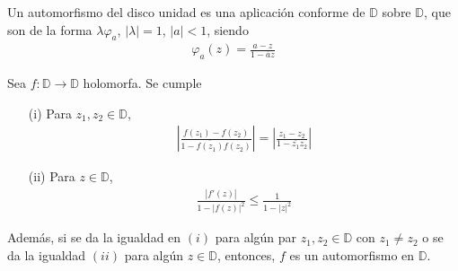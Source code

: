 \begin{defi}Un automorfismo del disco unidad es una aplicación conforme de $\mathbb{D}$ sobre $\mathbb{D}$, que son de la forma $\lambda\varphi_a$, $|\lambda| = 1$, $|a| < 1$, siendo
    \begin{align*}
        \varphi_a(z) = \frac{a-z}{1-\overline{a}z}
    \end{align*}
\end{defi}

\begin{teo}
    Sea $f: \mathbb{D} \longrightarrow \mathbb{D}$ holomorfa. Se cumple
    \begin{enumerate}
        \item[(i)] Para $z_1,z_2 \in \mathbb{D}$,
              \begin{align*}
                  \left| \frac{f(z_1) - f(z_2)}{1 -\overline{f(z_1)}f(z_2)} \right| = \left| \frac{z_1 - z_2}{1 - \overline{z_1}z_2} \right|
              \end{align*}
        \item[(ii)] Para $z \in \mathbb{D}$,
              \begin{align*}
                  \frac{|f'(z)|}{1-|f(z)|^2} \leq \frac{1}{1-|z|^2}
              \end{align*}
    \end{enumerate}
    Además, si se da la igualdad en $(i)$ para algún par $z_1,z_2 \in \mathbb{D}$ con $z_1 \not = z_2$ o se da la igualdad $(ii)$ para algún $z \in \mathbb{D}$, entonces, $f$ es un automorfismo en $\mathbb{D}$.
\end{teo}